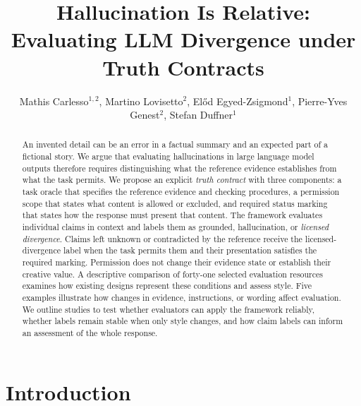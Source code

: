 \documentclass{clv2025}
\title{Hallucination Is Relative:
Evaluating LLM Divergence under Truth Contracts}
\author{Mathis Carlesso$^{1,2}$, Martino Lovisetto$^{2}$, El\H{o}d Egyed-Zsigmond$^{1}$, Pierre-Yves Genest$^{2}$, Stefan Duffner$^{1}$}
\affil{INSA Lyon, CNRS, LIRIS, UMR5205, Universit\'e Claude Bernard Lyon 1, 69621 Villeurbanne, France\\
  \quad \email{mathis.carlesso@insa-lyon.fr}}
\affil{Alteca, 69100 Villeurbanne, France}
\begin{document}
\maketitle


\begin{abstract}
An invented detail can be an error in a factual summary and an expected
part of a fictional story. We argue that evaluating hallucinations in
large language model outputs therefore requires distinguishing what the
reference evidence establishes from what the task permits. We propose an
explicit \emph{truth contract} with three components: a task oracle that
specifies the reference evidence and checking procedures, a permission
scope that states what content is allowed or excluded, and required status
marking that states how the response must present that content.
The framework evaluates individual claims in context and labels them as
grounded, hallucination, or \emph{licensed divergence}. Claims left unknown
or contradicted by the reference receive the licensed-divergence label
when the task permits them and their presentation satisfies the required
marking. Permission does not change their evidence state or establish
their creative value. A descriptive comparison of forty-one selected
evaluation resources examines how existing designs represent these
conditions and assess style. Five examples illustrate how changes in
evidence, instructions, or wording affect evaluation. We outline studies
to test whether evaluators can apply the framework reliably, whether
labels remain stable when only style changes, and how claim labels can
inform an assessment of the whole response.
\end{abstract}
\section{Introduction}\label{sec:intro}
\end{document}
